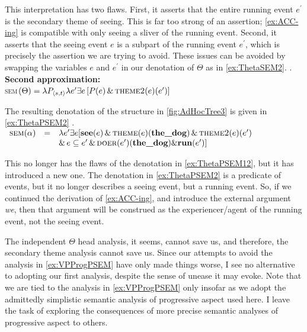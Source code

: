 \documentclass[MilwayThesis]{subfiles}
\begin{document}
This interpretation has two flaws.
First, it asserts that the entire running event $e^{\prime}$ is the secondary theme of seeing.
This is far too strong of an assertion; \cref{ex:ACC-ing} is compatible with only seeing a sliver of the running event.
Second, it asserts that the seeing event $e$ is a subpart of the running event $e^{\prime}$, which is precisely the assertion we are trying to avoid.
These issues can be avoided by swapping the variables $e$ and $e^{\prime}$ in our denotation of $\Theta$ as in \cref{ex:ThetaSEM2}.
\ex. \textbf{Second approximation:}\\ \textsc{sem}$(\Theta) = \lambda P_{\langle s,t\rangle} \lambda e^{\prime} \exists e\left[ P(e)\,\&\,\textsc{theme2}(e)(e^{\prime}) \right]$\label{ex:ThetaSEM2}

The resulting denotation of the structure in \cref{fig:AdHocTree3} is given in \cref{ex:ThetaPSEM2}
\ex.\label{ex:ThetaPSEM2} 
$
\begin{array}[t]{rcl}
	\textsc{sem}(\alpha) & = & \lambda e^{\prime} \exists e [ \textbf{see}(e)\,\&\,\textsc{theme}(e)(\textbf{the\_dog})\,\&\,\textsc{theme2}(e)(e^{\prime})\\
		& & \&\,e\subseteq e^{\prime} \,\&\, \textsc{doer}(e^{\prime})(\textbf{the\_dog}) \& \textbf{run}(e^{\prime})]
\end{array}
$

This no longer has the flaws of the denotation in \cref{ex:ThetaPSEM12}, but it has introduced a new one.
The denotation in \cref{ex:ThetaPSEM2} is a predicate of events, but it no longer describes a seeing event, but a running event.
So, if we continued the derivation of \cref{ex:ACC-ing}, and introduce the external argument \textit{we}, then that argument will be construed as the experiencer/agent of the running event, not the seeing event.

The independent $\Theta$ head analysis, it seems, cannot save us, and therefore, the secondary theme analysis cannot save us.
Since our attempts to avoid the analysis in \cref{ex:VPProgPSEM} have only made things worse, I see no alternative to adopting our first analysis, despite the sense of unease it may evoke.
Note that we are tied to the analysis in \cref{ex:VPProgPSEM} only insofar as we adopt the admittedly simplistic semantic analysis of progressive aspect used here.
I leave the task of exploring the consequences of more precise semantic analyses of progressive aspect to others.
\end{document}
